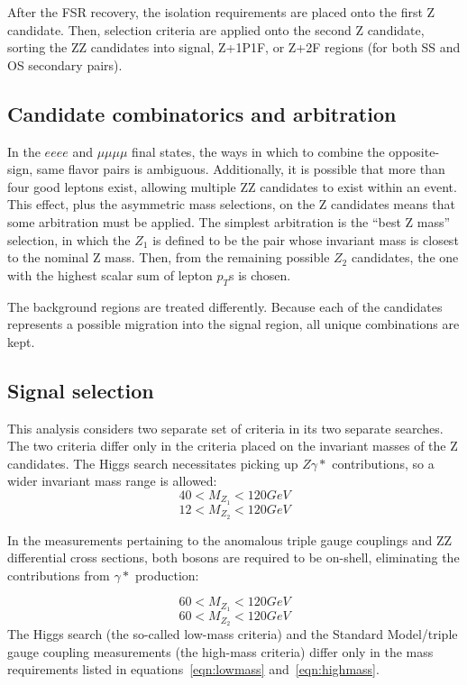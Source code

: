 After the FSR recovery, the isolation requirements are placed onto the first Z
candidate. Then, selection criteria are applied onto the second Z candidate,
sorting the ZZ candidates into signal, Z+1P1F, or Z+2F regions (for both SS and OS
secondary pairs).

\subsection{Candidate combinatorics and arbitration}
In the $eeee$ and $\mu\mu\mu\mu$ final states, the ways in which to
combine the opposite-sign, same flavor pairs is ambiguous. Additionally, it is
possible that more than four good leptons exist, allowing multiple ZZ candidates
to exist within an event. 
This effect, plus the asymmetric mass selections, on the Z candidates means that
some arbitration must be applied. The simplest arbitration is the ``best Z
mass'' selection, in which the $Z_1$ is defined to be the pair whose invariant
mass is closest to the nominal Z mass. Then, from the remaining possible $Z_2$
candidates, the one with the highest scalar sum of lepton $p_T$s is chosen.

The background regions are treated differently. Because each of the candidates
represents a possible migration into the signal region, all unique combinations
are kept. 

\subsection{Signal selection}
This analysis considers two separate set of criteria in its two separate
searches. The two criteria differ only in the criteria placed on the invariant
masses of the Z candidates.
The Higgs search necessitates picking up $Z\gamma*$ contributions, so a wider
invariant mass range is allowed:
\begin{equation*}
40 < M_{Z_1} < 120 GeV
\end{equation*}
\begin{equation}
12 < M_{Z_2} < 120 GeV
\label{eqn:lowmass}
\end{equation}

In the measurements pertaining to the anomalous triple gauge couplings and
ZZ differential cross sections, both \Z bosons are required to be on-shell,
eliminating the contributions from $\gamma *$ production:

\begin{equation*}
60 < M_{Z_1} < 120 GeV
\end{equation*}
\begin{equation}
60 < M_{Z_2} < 120 GeV
\label{eqn:highmass}
\end{equation}
The Higgs search (the so-called low-mass criteria) and the Standard Model/triple
gauge coupling measurements (the high-mass criteria) differ only in the mass
requirements listed in equations~\ref{eqn:lowmass} and~\ref{eqn:highmass}.

